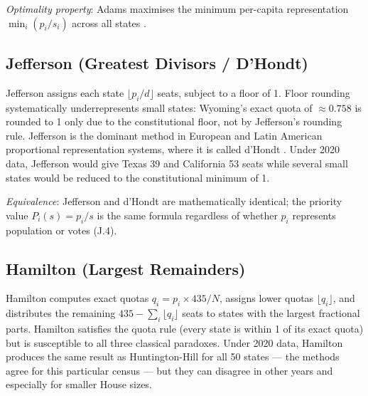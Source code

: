 \textit{Optimality property}: Adams maximises the minimum per-capita
representation $\min_i (p_i/s_i)$ across all states
\citep{balinski1982fair}.

\subsection{Jefferson (Greatest Divisors / D'Hondt)}

Jefferson assigns each state $\lfloor p_i/d \rfloor$ seats, subject to
a floor of 1.
Floor rounding systematically underrepresents small states:
Wyoming's exact quota of $\approx 0.758$ is rounded to 1 only due to the
constitutional floor, not by Jefferson's rounding rule.
Jefferson is the dominant method in European and Latin American
proportional representation systems, where it is called d'Hondt
\citep{lijphart1986degrees}.
Under 2020 data, Jefferson would give Texas 39 and California 53 seats
while several small states would be reduced to the constitutional
minimum of 1.

\textit{Equivalence}: Jefferson and d'Hondt are mathematically identical;
the priority value $P_i(s) = p_i/s$ is the same formula
regardless of whether $p_i$ represents population or votes (J.4).

\subsection{Hamilton (Largest Remainders)}

Hamilton computes exact quotas $q_i = p_i \times 435 / N$,
assigns lower quotas $\lfloor q_i \rfloor$, and distributes the
remaining $435 - \sum_i \lfloor q_i \rfloor$ seats to states
with the largest fractional parts.
Hamilton satisfies the quota rule (every state is within 1 of its
exact quota) but is susceptible to all three classical paradoxes.
Under 2020 data, Hamilton produces the same result as Huntington-Hill
for all 50 states --- the methods agree for this particular census ---
but they can disagree in other years and especially for smaller House sizes.

